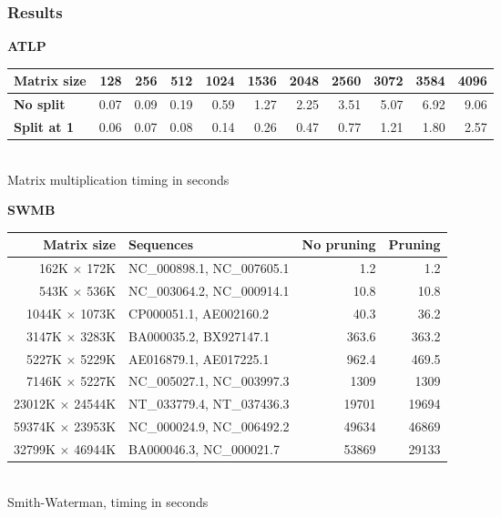 \subsubsection*{Results}
\textbf{ATLP\cite{gpu_atlp}}
\begin{center}\begin{tabular}{lrrrrrrrrrr} \toprule
\bf Matrix size & 128 & 256 & 512 & 1024 & 1536 & 2048 & 2560 & 3072 & 3584 & 4096 \\ \midrule
\bf No split & 0.07 & 0.09 & 0.19 & 0.59 & 1.27 & 2.25 & 3.51 & 5.07 & 6.92 & 9.06 \\
\bf Split at 1 & 0.06 & 0.07 & 0.08 & 0.14 & 0.26 & 0.47 & 0.77 & 1.21 & 1.80 & 2.57 \\ \bottomrule
\end{tabular} \\[4pt] Matrix multiplication timing in seconds \end{center}

\textbf{SWMB\cite{swat_mega}}
\begin{center}\begin{tabular}{rlrr} \toprule
\bf Matrix size & \bf Sequences & \bf No pruning & \bf Pruning \\ \midrule
162K $\times$ 172K		& NC\_000898.1, NC\_007605.1	& 1.2 & 1.2 \\
543K $\times$ 536K		& NC\_003064.2, NC\_000914.1	& 10.8 & 10.8 \\
1044K $\times$ 1073K	& CP000051.1, AE002160.2		& 40.3 & 36.2 \\
3147K $\times$ 3283K	& BA000035.2, BX927147.1		& 363.6 & 363.2 \\ 
5227K $\times$ 5229K	& AE016879.1, AE017225.1		& 962.4 & 469.5 \\
7146K $\times$ 5227K	& NC\_005027.1, NC\_003997.3	& 1309 & 1309 \\
23012K $\times$ 24544K	& NT\_033779.4, NT\_037436.3	& 19701 & 19694 \\
59374K $\times$ 23953K	& NC\_000024.9, NC\_006492.2	& 49634 & 46869 \\
32799K $\times$ 46944K	& BA000046.3, NC\_000021.7		& 53869 & 29133 \\ \bottomrule
\end{tabular} \\[4pt] Smith-Waterman, timing in seconds \end{center}

